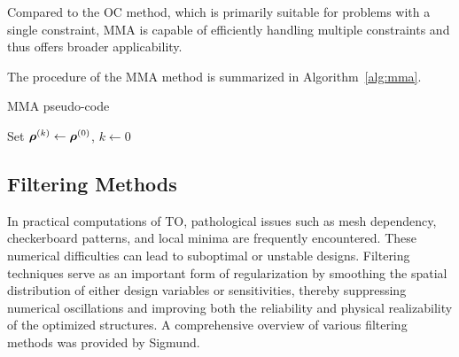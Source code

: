 \documentclass[mathpazo]{cicp}
\begin{document}
Compared to the OC method, which is primarily suitable for problems with a single constraint, MMA is capable of efficiently handling multiple constraints and thus offers broader applicability.

The procedure of the MMA method is summarized in Algorithm~\ref{alg:mma}.
\vspace{-1ex} %
\begin{algorithm}[H]
	\caption{MMA pseudo-code}
	\label{alg:mma}
	\begin{minipage}{\textwidth}
		Set $\boldsymbol{\rho}^{(k)} \leftarrow \boldsymbol{\rho}^{(0)}$, $k \leftarrow 0$\;
		
	\end{minipage}
\end{algorithm}
\vspace{-1ex} %

\subsection{Filtering Methods}
In practical computations of TO, pathological issues such as mesh dependency, checkerboard patterns, and local minima are frequently encountered\cite{bendsoe2013topology}. These numerical difficulties can lead to suboptimal or unstable designs. Filtering techniques serve as an important form of regularization by smoothing the spatial distribution of either design variables or sensitivities, thereby suppressing numerical oscillations and improving both the reliability and physical realizability of the optimized structures\cite{sigmund1998numerical}. A comprehensive overview of various filtering methods was provided by Sigmund\cite{sigmund2007morphology}. 
\end{document}
